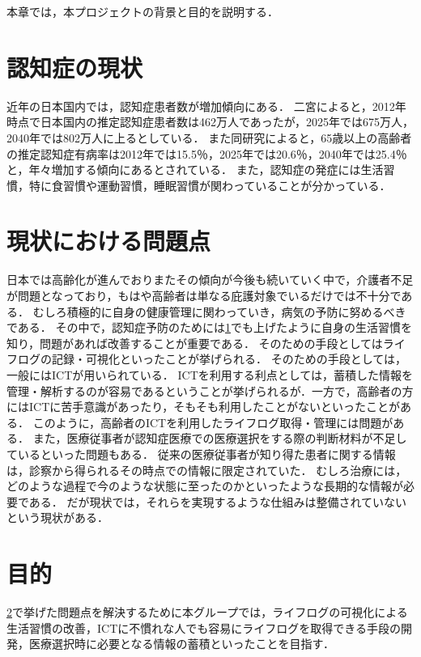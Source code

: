 \documentclass[../report]{subfiles}
\begin{document}
本章では，本プロジェクトの背景と目的を説明する．

\section{認知症の現状} \label{sec:genzyou}
近年の日本国内では，認知症患者数が増加傾向にある．
二宮によると，2012年時点で日本国内の推定認知症患者数は462万人であったが，2025年では675万人，2040年では802万人に上るとしている．
また同研究によると，65歳以上の高齢者の推定認知症有病率は2012年では15.5％，2025年では20.6％，2040年では25.4％と，年々増加する傾向にあるとされている．
また，認知症の発症には生活習慣，特に食習慣や運動習慣，睡眠習慣が関わっていることが分かっている．

\section{現状における問題点} \label{sec:mondai}
日本では高齢化が進んでおりまたその傾向が今後も続いていく中で，介護者不足が問題となっており，もはや高齢者は単なる庇護対象でいるだけでは不十分である．
むしろ積極的に自身の健康管理に関わっていき，病気の予防に努めるべきである．
その中で，認知症予防のためには\ref{sec:genzyou}でも上げたように自身の生活習慣を知り，問題があれば改善することが重要である．
そのための手段としてはライフログの記録・可視化といったことが挙げられる．
そのための手段としては，一般にはICTが用いられている．
ICTを利用する利点としては，蓄積した情報を管理・解析するのが容易であるということが挙げられるが．一方で，高齢者の方にはICTに苦手意識があったり，そもそも利用したことがないといったことがある．
このように，高齢者のICTを利用したライフログ取得・管理には問題がある．
また，医療従事者が認知症医療での医療選択をする際の判断材料が不足しているといった問題もある．
従来の医療従事者が知り得た患者に関する情報は，診察から得られるその時点での情報に限定されていた．
むしろ治療には，どのような過程で今のような状態に至ったのかといったような長期的な情報が必要である．
だが現状では，それらを実現するような仕組みは整備されていないという現状がある．

\section{目的}
\ref{sec:mondai}で挙げた問題点を解決するために本グループでは，ライフログの可視化による生活習慣の改善，ICTに不慣れな人でも容易にライフログを取得できる手段の開発，医療選択時に必要となる情報の蓄積といったことを目指す．
\end{document}

